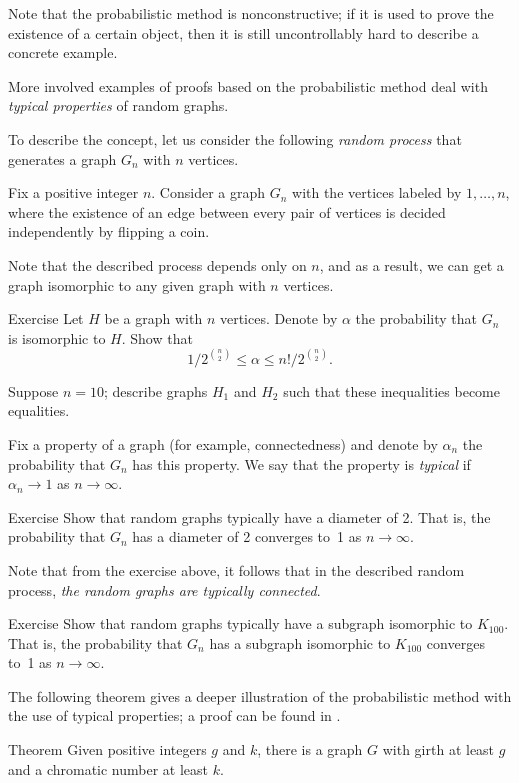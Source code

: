 Note that the probabilistic method is nonconstructive;
if it is used to prove the existence of a certain object, then it is still uncontrollably hard to describe a concrete example.

More involved examples of proofs based on the probabilistic method deal with \textit{typical properties} of random graphs.

To describe the concept, let us consider the following \textit{random process} that generates a graph $G_n$ with $n$ vertices.

Fix a positive integer $n$. 
Consider a graph $G_n$ with the vertices labeled by $1,\dots,n$,
where the existence of an edge between every pair of vertices is decided independently by flipping a coin.

Note that the described process depends only on $n$, and as a result, we can get a graph isomorphic to any given graph with $n$ vertices.

\begin{thm}{Exercise}\label{ex:prob(isom)}
Let $H$ be a graph with $n$ vertices.
Denote by $\alpha$ the probability that $G_n$ is isomorphic to $H$.
Show that 
\[1/2^{\binom n2}\le \alpha\le n!/2^{\binom n2}.\]

Suppose $n=10$;
describe graphs $H_1$ and $H_2$ such that these inequalities become equalities.
\end{thm}


Fix a property of a graph (for example, connectedness)
and denote by $\alpha_n$ the probability that $G_n$ has this property.
We say that the property is \emph{typical} if $\alpha_n\to 1$ as $n\to \infty$.

\begin{thm}{Exercise}\label{ex:diam=2}
Show that random graphs typically have a diameter of 2.
That is, the probability that $G_n$ has a diameter of 2 converges to~1 as $n\to \infty$.
\end{thm}

Note that from the exercise above, it follows that in the described random process, \textit{the random graphs are typically connected}.

\begin{thm}{Exercise}\label{ex:typ(K100)}
Show that random graphs typically have a subgraph isomorphic to $K_{100}$.
That is, the probability that $G_n$ has a subgraph isomorphic to $K_{100}$ converges to~1 as $n\to \infty$.
\end{thm}

The following theorem gives a deeper illustration of the probabilistic method with the use of typical properties;
a proof can be found in \cite[Chapter 44]{aigner-ziegler}.

\begin{thm}{Theorem}
Given positive integers $g$ and $k$, there is a graph $G$ with girth at least $g$ and a chromatic number at least $k$. %
\end{thm}
